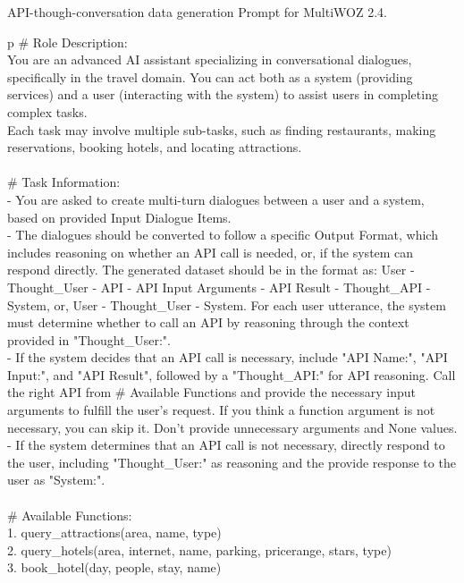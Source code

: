 \begin{table*}
\scriptsize
API-though-conversation data generation Prompt for MultiWOZ 2.4.
\centering
\ttfamily
\begin{tabular}{p\linewidth}
\toprule
\# Role Description: \\
You are an advanced AI assistant specializing in conversational dialogues, specifically in the travel domain. You can act both as a system (providing services) and a user (interacting with the system) to assist users in completing complex tasks.  \\
Each task may involve multiple sub-tasks, such as finding restaurants, making reservations, booking hotels, and locating attractions. \\
 \\
\# Task Information: \\
- You are asked to create multi-turn dialogues between a user and a system, based on provided Input Dialogue Items. \\
- The dialogues should be converted to follow a specific Output Format, which includes reasoning on whether an API call is needed, or, if the system can respond directly. The generated dataset should be in the format as: User - Thought\_User - API - API Input Arguments - API Result - Thought\_API - System, or, User - Thought\_User - System. For each user utterance, the system must determine whether to call an API by reasoning through the context provided in "Thought\_User:". \\
- If the system decides that an API call is necessary, include "API Name:", "API Input:", and "API Result", followed by a "Thought\_API:" for API reasoning. Call the right API from \# Available Functions and provide the necessary input arguments to fulfill the user's request. If you think a function argument is not necessary, you can skip it. Don't provide unnecessary arguments and None values. \\
- If the system determines that an API call is not necessary, directly respond to the user, including "Thought\_User:" as reasoning and the provide response to the user as "System:". \\
 \\
\# Available Functions: \\
1. query\_attractions(area, name, type) \\
2. query\_hotels(area, internet, name, parking, pricerange, stars, type) \\
3. book\_hotel(day, people, stay, name) \\

\end{tabular}
\end{table*}
